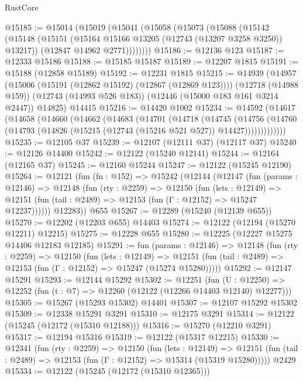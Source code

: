 \begin{lexlean}{RustCore}
\begin{coremodule}
@15185 := @15014
    (@15019
      (@15041
        (@15058
          (@15073
            (@15088
              (@15142
                (@15148
                  (@15151 (@15164 @15166 @13205 (@12743 (@13207 @3258 @3250)) @13217))
                  (@12847 @14962 @2771))))))))
@15186 := @12136 @123
@15187 := @12333 @15186
@15188 := @15185 @15187
@15189 := @12207 @1815
@15191 := @15188 (@12858 @15189)
@15192 := @12231 @1815
@15215 := @14939
    (@14957
      (@15006 (@15191 (@12862 @15192) (@12867 (@12869 @123))))
      (@12718 (@14988 @159))
      (@12743 (@14993 @526 @183))
      (@12446 (@15000 @183 @161 @3214 @2447))
      @14825)
    @14415
@15216 := @14420 @1002
@15234 := @14592
    (@14617
      (@14658
        (@14660
          (@14662
            (@14683
              (@14701
                (@14718
                  (@14745
                    (@14756
                      (@14760
                        (@14793 (@14826 (@15215 (@12743 (@15216 @521 @527)) @14427)))))))))))))
@15235 := @12105 @37
@15239 := @12107 (@12111 @37) (@12117 @37)
@15240 := @12126 @14400
@15242 := @12122 (@15240 @12141)
@15244 := @12164 (@12165 @37)
@15245 := @12160 @15244
@15247 := @12122 (@15245 @12190)
@15264 := @12121
    (fun (fn : @152) =>
    @15242
      (@12144
        (@12147
          (fun (params : @12146) =>
          @12148
            (fun (rty : @2259) =>
            @12150
              (fun (lets : @12149) =>
              @12151 (fun (tail : @2489) => @12153 (fun (Γ : @12152) => @15247 @12237))))))
        @12283))
    @655
@15267 := @12289 (@15240 (@12139 @655))
@15270 := @12202 (@12203 @655) @14403
@15274 := @12122 (@12194 (@15270 @12211) @12215)
@15275 := @12228 @655
@15280 := @12225 (@12227 @15275 @14406 @12183 @12185)
@15291 := fun (params : @12146) =>
  @12148
    (fun (rty : @2259) =>
    @12150
      (fun (lets : @12149) =>
      @12151 (fun (tail : @2489) => @12153 (fun (Γ : @12152) => @15247 (@15274 @15280)))))
@15292 := @12147 @15291
@15293 := @12144 @15292
@15302 := @12251
    (fun (U : @12250) => @12252 (fun (t : @7) => @12260 (@12122 (@12266 @14403 @12140) @12277)))
@15305 := @15267 (@15293 @15302) @14401
@15307 := @12107 @15292 @15302
@15309 := @12338 @15291 @3291
@15310 := @12175 @3291
@15314 := @12122 (@15245 (@12172 (@15310 @12188)))
@15316 := @15270 (@12210 @3291)
@15317 := @12194 @15316
@15319 := @12122 (@15317 @12215)
@15330 := @12341
    (fun (rty : @2259) =>
    @12150
      (fun (lets : @12149) =>
      @12151 (fun (tail : @2489) => @12153 (fun (Γ : @12152) => @15314 (@15319 @15280)))))
    @2429
@15334 := @12122 (@15245 (@12172 (@15310 @12365)))

\end{coremodule}
\end{lexlean}

